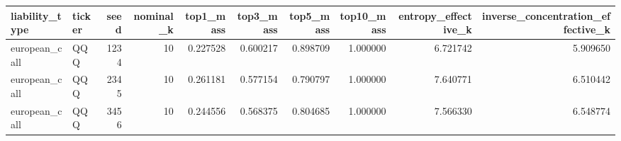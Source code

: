 \begin{tabular}{llrrrrrrrr}
\toprule
liability\_type & ticker & seed & nominal\_k & top1\_mass & top3\_mass & top5\_mass & top10\_mass & entropy\_effective\_k & inverse\_concentration\_effective\_k \\
\midrule
european\_call & QQQ & 1234 & 10 & 0.227528 & 0.600217 & 0.898709 & 1.000000 & 6.721742 & 5.909650 \\
european\_call & QQQ & 2345 & 10 & 0.261181 & 0.577154 & 0.790797 & 1.000000 & 7.640771 & 6.510442 \\
european\_call & QQQ & 3456 & 10 & 0.244556 & 0.568375 & 0.804685 & 1.000000 & 7.566330 & 6.548774 \\
\bottomrule
\end{tabular}
